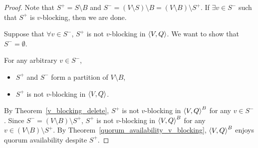 \documentclass[12pt, psamsfonts]{amsart}
\theoremstyle{definition}
\theoremstyle{remark}
\numberwithin{equation}{subsection}
\begin{document}
\begin{proof}
    Note that $S^{+} = S \setminus B$ and $S^{-} = (V \setminus S) \setminus B = (V \setminus B) \setminus S^{+}$.
    If $\exists v \in S^{-}$ such that $S^{+}$ is $v$-blocking, then we are done.

    Suppose that $\forall v \in S^{-}$, $S^{+}$ is not $v$-blocking in $\ev{V, Q}$.
    We want to show that $S^{-} = \emptyset$.

    For any arbitrary $v \in S^{-}$,
    \begin{itemize}
        \item
            $S^{+}$ and $S^{-}$ form a partition of $V \setminus B$,
        \item
            $S^{+}$ is not $v$-blocking in $\ev{V, Q}$.
    \end{itemize}
    By Theorem~\ref{v_blocking_delete}, $S^{+}$ is not $v$-blocking in $\ev{V, Q}^B$ for any $v \in S^{-}$.
    Since $S^{-} = (V \setminus B) \setminus S^{+}$, $S^{+}$ is not $v$-blocking in $\ev{V, Q}^B$ for any $v \in (V \setminus B) \setminus S^{+}$.
    By Theorem~\ref{quorum_availability_v_blocking}, $\ev{V, Q}^B$ enjoys quorum availability despite $S^{+}$.


\end{proof}
\end{document}
